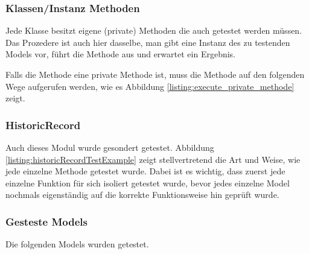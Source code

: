 \documentclass[12pt,             %
               a4paper,          %
               listof=totoc,     %
               index=totoc,      %
               bibliography=totoc,%
               oneside,         %
               BCOR1cm,          %
               english   %
               ]{scrbook}
\begin{document}
\label{listing:default_test_attributes}

\subsubsection{Klassen/Instanz Methoden}
Jede Klasse besitzt eigene (private) Methoden die auch getestet werden müssen. Das Prozedere ist auch hier dasselbe, man gibt eine Instanz des zu testenden Models vor, führt die Methode aus und erwartet ein Ergebnis.

\label{listing:default_test_instance_methods}

Falls die Methode eine private Methode ist, muss die Methode auf den folgenden Wege aufgerufen werden, wie es Abbildung \vref{listing:execute_private_methode} zeigt.

\label{listing:execute_private_methode}

\subsubsection{HistoricRecord}
Auch dieses Modul wurde gesondert getestet. Abbildung \vref{listing:historicRecordTestExample} zeigt stellvertretend die Art und Weise, wie jede einzelne Methode getestet wurde. Dabei ist es wichtig, dass zuerst jede einzelne Funktion für sich isoliert getestet wurde, bevor jedes einzelne Model nochmals eigenständig auf die korrekte Funktionsweise hin geprüft wurde.

 \label{listing:historicRecordTestExample}


\subsubsection{Gesteste Models}
Die folgenden Models wurden getestet.
\end{document}
